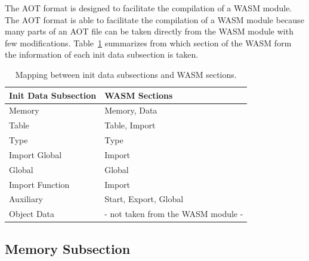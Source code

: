 \documentclass{article}
\begin{document}
The AOT format is designed to facilitate the compilation of a WASM module.
The AOT format is able to facilitate the compilation of a WASM module because many parts of an AOT file can be taken directly from the WASM module with few modifications.
Table~\ref{table:aot-subsection-wasm-section} summarizes from which section of the WASM form the information of each init data subsection is taken.

\begin{table}[H]
\centering
\begin{tabular}{ll}
    \hline
    Init Data Subsection & WASM Sections \\
    \hline
    Memory          & Memory, Data \\
    Table           & Table, Import \\
    Type            & Type \\
    Import Global   & Import \\
    Global          & Global \\
    Import Function & Import \\
    Auxiliary       & Start, Export, Global \\
    Object Data     & - not taken from the WASM module - \\
    \hline
\end{tabular}
\caption{Mapping between init data subsections and WASM sections.}
\label{table:aot-subsection-wasm-section}
\end{table}

\subsection{Memory Subsection}
\label{sec:memory-subsection}
\end{document}
